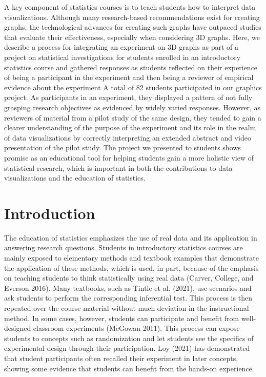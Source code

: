 \documentclass[
  12pt,
]{article}
\begin{document}
A key component of statistics courses is to teach students how to
interpret data visualizations. Although many research-based
recommendations exist for creating graphs, the technological advances
for creating such graphs have outpaced studies that evaluate their
effectiveness, especially when considering 3D graphs. Here, we describe
a process for integrating an experiment on 3D graphs as part of a
project on statistical investigations for students enrolled in an
introductory statistics course and gathered responses as students
reflected on their experience of being a participant in the experiment
and then being a reviewer of empirical evidence about the experiment A
total of 82 students participated in our graphics project. As
participants in an experiment, they displayed a pattern of not fully
grasping research objectives as evidenced by widely varied responses.
However, as reviewers of material from a pilot study of the same design,
they tended to gain a clearer understanding of the purpose of the
experiment and its role in the realm of data visualizations by correctly
interpreting an extended abstract and video presentation of the pilot
study. The project we presented to students shows promise as an
educational tool for helping students gain a more holistic view of
statistical research, which is important in both the contributions to
data visualizations and the education of statistics.

\section{Introduction}\label{introduction}

The education of statistics emphasizes the use of real data and its
application in answering research questions. Students in introductory
statistics courses are mainly exposed to elementary methods and textbook
examples that demonstrate the application of these methods, which is
used, in part, because of the emphasis on teaching students to think
statistically using real data (Carver, College, and Everson 2016). Many
textbooks, such as Tintle et al. (2021), use scenarios and ask students
to perform the corresponding inferential test. This process is then
repeated over the course material without much deviation in the
instructional method. In some cases, however, students can participate
and benefit from well-designed classroom experiments (McGowan 2011).
This process can expose students to concepts such as randomization and
let students see the specifics of experimental design through their
participation. Loy (2021) has demonstrated that student participants
often recalled their experiment in later concepts, showing some evidence
that students can benefit from the hands-on experience.
\end{document}
